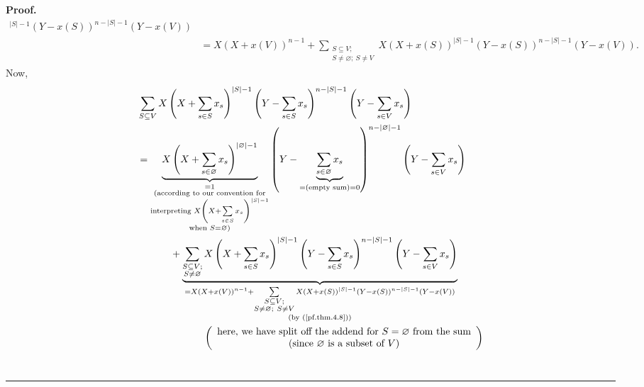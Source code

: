 \documentclass[numbers=enddot,12pt,final,onecolumn,notitlepage]{scrartcl}%
\theoremstyle{definition}
\newenvironment{proof}[1][Proof]{\noindent\textbf{#1.} }{\ \rule{0.5em}{0.5em}}
\let\sumnonlimits\sum
\renewcommand{\sum}{\sumnonlimits\limits}
\newenvironment{verlong}{}{}
\begin{document}
\begin{verlong}
\begin{proof}
\begin{align}
^{\left\vert S\right\vert -1}\left(  Y-x\left(  S\right)  \right)
^{n-\left\vert S\right\vert -1}\left(  Y-x\left(  V\right)  \right)
\nonumber\\
&  =X\left(  X+x\left(  V\right)  \right)  ^{n-1}+\sum_{\substack{S\subseteq
V;\\S\neq\varnothing;\ S\neq V}}X\left(  X+x\left(  S\right)  \right)
^{\left\vert S\right\vert -1}\left(  Y-x\left(  S\right)  \right)
^{n-\left\vert S\right\vert -1}\left(  Y-x\left(  V\right)  \right)  .
\label{pf.thm.4.8}%
\end{align}
Now,%
\begin{align*}
&  \sum_{S\subseteq V}X\left(  X+\sum_{s\in S}x_{s}\right)  ^{\left\vert
S\right\vert -1}\left(  Y-\sum_{s\in S}x_{s}\right)  ^{n-\left\vert
S\right\vert -1}\left(  Y-\sum_{s\in V}x_{s}\right) \\
&  =\underbrace{X\left(  X+\sum_{s\in\varnothing}x_{s}\right)  ^{\left\vert
\varnothing\right\vert -1}}_{\substack{=1\\\text{(according to our convention
for}\\\text{interpreting }X\left(  X+\sum_{s\in S}x_{s}\right)  ^{\left\vert
S\right\vert -1}\\\text{when }S=\varnothing\text{)}}}\left(
Y-\underbrace{\sum_{s\in\varnothing}x_{s}}_{=\left(  \text{empty sum}\right)
=0}\right)  ^{n-\left\vert \varnothing\right\vert -1}\left(  Y-\sum_{s\in
V}x_{s}\right) \\
&  \ \ \ \ \ \ \ \ \ \ +\underbrace{\sum_{\substack{S\subseteq V;\\S\neq
\varnothing}}X\left(  X+\sum_{s\in S}x_{s}\right)  ^{\left\vert S\right\vert
-1}\left(  Y-\sum_{s\in S}x_{s}\right)  ^{n-\left\vert S\right\vert -1}\left(
Y-\sum_{s\in V}x_{s}\right)  }_{\substack{=X\left(  X+x\left(  V\right)
\right)  ^{n-1}+\sum_{\substack{S\subseteq V;\\S\neq\varnothing;\ S\neq
V}}X\left(  X+x\left(  S\right)  \right)  ^{\left\vert S\right\vert -1}\left(
Y-x\left(  S\right)  \right)  ^{n-\left\vert S\right\vert -1}\left(
Y-x\left(  V\right)  \right)  \\\text{(by (\ref{pf.thm.4.8}))}}}\\
&  \ \ \ \ \ \ \ \ \ \ \ \ \ \ \ \ \ \ \ \ \left(
\begin{array}
[c]{c}%
\text{here, we have split off the addend for }S=\varnothing\text{ from the
sum}\\
\text{(since }\varnothing\text{ is a subset of }V\text{)}%
\end{array}
\right) \\

\end{align*}
\end{proof}
\end{verlong}
\end{document}
